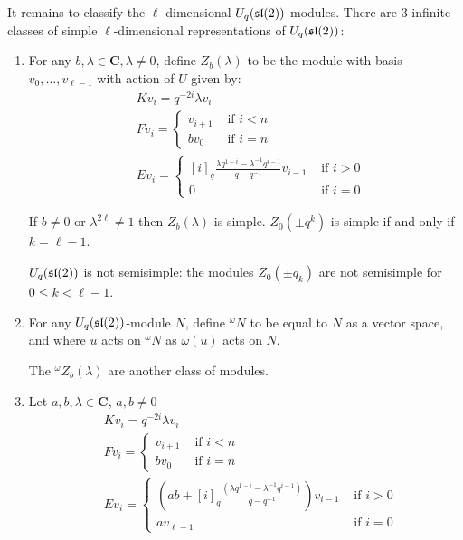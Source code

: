 It remains to classify the $\ell$-dimensional $U_q(\mathfrak{sl}(2))$-modules.
There are $3$ infinite classes of simple $\ell$-dimensional representations of  $U_q(\mathfrak{sl}(2))$:
\begin{enumerate}
        \item For any $b,\lambda \in \mathbf{C}, \lambda \neq 0$, define
            $Z_b(\lambda)$ to be the module with basis $v_0, \ldots, v_{\ell -
            1}$ with action of $U$ given by: 
\begin{align*}
    &K v_i = q^{-2i} \lambda v_i \\
    &F v_i = \begin{cases} v_{i+1}& \text{ if $i < n$} \\  b v_0& \text{ if $i = n$} \end{cases}  \\
    &E v_i = \begin{cases} 
        [i]_q \frac{\lambda q^{1-i} - \lambda^{-1} q^{i-1}}{q - q^{-1}} v_{i-1}& \text{ if $i > 0$} \\ 
                    0& \text{ if $i = 0$} 
             \end{cases} 
\end{align*}

If $b \neq 0$ or $\lambda^{2\ell}\neq 1$ then $Z_b(\lambda)$ is simple.
$Z_0(\pm q^k)$ is simple if and only if $k = \ell - 1$. 

\begin{remark}
    $U_q(\mathfrak{sl}(2))$ is not semisimple: the modules $Z_0(\pm q_k)$ are not
    semisimple for $0 \leq k < \ell - 1$.
\end{remark}
\item For any $U_q(\mathfrak{sl}(2))$-module $N$, define $^\omega N$ to be
    equal to $N$ as a vector space, and where $u$ acts on $^\omega N$ as
    $\omega(u)$ acts on $N$.

    The $^\omega Z_b(\lambda)$ are another class of modules.
\item Let $a,b,\lambda \in \mathbf{C}$, $a,b\neq 0$
\begin{align*}
    &K v_i = q^{-2i} \lambda v_i \\
    &F v_i = \begin{cases} 
                v_{i+1}& \text{ if $i < n$} \\  
                b v_0& \text{ if $i = n$} 
             \end{cases}  \\
    &E v_i = \begin{cases} 
                \left(ab + [i]_q \frac{(\lambda q^{1-i} - \lambda^{-1} q^{i-1})}{q - q^{-1}}\right) v_{i-1}& \text{ if $i > 0$} \\ 
                a v_{\ell - 1}& \text{ if $i = 0$} 
             \end{cases} 
\end{align*}
\end{enumerate}


